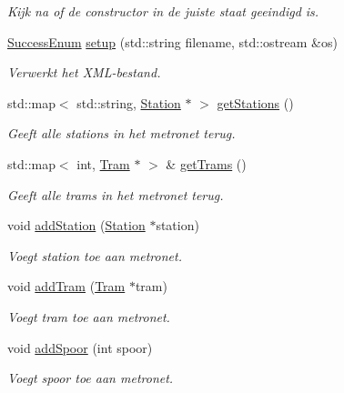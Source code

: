 \begin{DoxyCompactItemize}
\begin{DoxyCompactList}\small\item\em Kijk na of de constructor in de juiste staat geeindigd is. \end{DoxyCompactList}\item 
\hyperlink{_metronet_8h_ae69e1bf070c1c339170236b3fef70a4d}{Success\+Enum} \hyperlink{class_metronet_ad12d6e52c7f5c23d23e87992b4abc1fa}{setup} (std\+::string filename, std\+::ostream \&os)
\begin{DoxyCompactList}\small\item\em Verwerkt het X\+M\+L-\/bestand. \end{DoxyCompactList}\item 
std\+::map$<$ std\+::string, \hyperlink{class_station}{Station} $\ast$ $>$ \hyperlink{class_metronet_a756f8163c67c4e559699b9c508fb1346}{get\+Stations} ()
\begin{DoxyCompactList}\small\item\em Geeft alle stations in het metronet terug. \end{DoxyCompactList}\item 
std\+::map$<$ int, \hyperlink{class_tram}{Tram} $\ast$ $>$ \& \hyperlink{class_metronet_a9aab7bfe14dbd5f7e258a55007542c36}{get\+Trams} ()
\begin{DoxyCompactList}\small\item\em Geeft alle trams in het metronet terug. \end{DoxyCompactList}\item 
void \hyperlink{class_metronet_ac7f4069e577cd4dddb1e166923df3ecb}{add\+Station} (\hyperlink{class_station}{Station} $\ast$station)
\begin{DoxyCompactList}\small\item\em Voegt station toe aan metronet. \end{DoxyCompactList}\item 
void \hyperlink{class_metronet_a3a01132772f4a367d83af40a3c02e224}{add\+Tram} (\hyperlink{class_tram}{Tram} $\ast$tram)
\begin{DoxyCompactList}\small\item\em Voegt tram toe aan metronet. \end{DoxyCompactList}\item 
void \hyperlink{class_metronet_a0422381a8d7f32a915e0ad966af43627}{add\+Spoor} (int spoor)
\begin{DoxyCompactList}\small\item\em Voegt spoor toe aan metronet. \end{DoxyCompactList}\item 

\end{DoxyCompactItemize}
